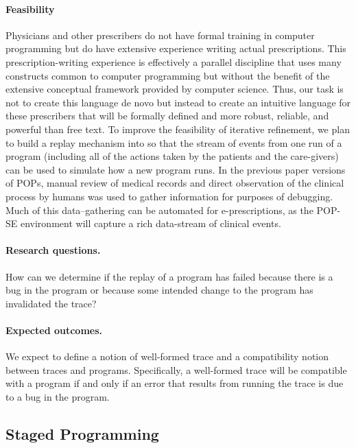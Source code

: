 \paragraph{Feasibility} 
Physicians and other prescribers do not have formal training in
computer programming but do have extensive experience writing actual
prescriptions. This prescription-writing experience is effectively a
parallel discipline that uses many constructs common to computer
programming but without the benefit of the extensive conceptual
framework provided by computer science.  Thus, our task is not to
create this language de novo but instead to create an intuitive
language for these prescribers that will be formally defined and more
robust, reliable, and powerful than free text.  To improve the
feasibility of iterative refinement, we plan to build a replay
mechanism into \poppl{} so that the stream of events from one run of a
program (including all of the actions taken by the patients and the
care-givers) can be used to simulate how a new \poppl{} program
runs. In the previous paper versions of POPs, manual review of medical
records and direct observation of the clinical process by humans was
used to gather information for purposes of debugging. Much of this
data–gathering can be automated for e-prescriptions, as the POP-SE
environment will capture a rich data-stream of clinical events.

\paragraph{Research questions.} How can we determine if the replay of
a \poppl{} program has failed because there is a bug in the program or
because some intended change to the program has invalidated the trace?

\paragraph{Expected outcomes.} We expect to define a notion of
well-formed trace and a compatibility notion between traces and
programs. Specifically, a well-formed trace will be compatible with a
\poppl{} program if and only if an error that results from running the
trace is due to a bug in the program.

\subsection{Staged Programming}\label{sec:staged-programming}

